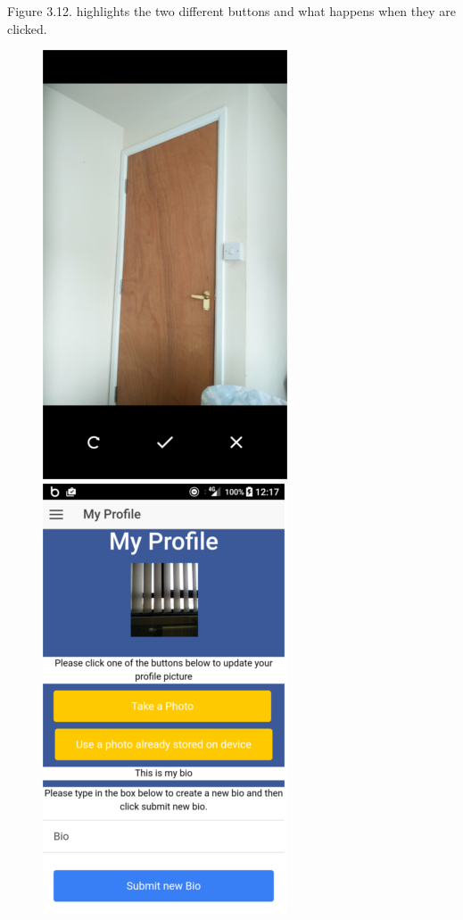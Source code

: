 Figure 3.12. highlights the two different buttons and what happens when they are clicked.
\begin{center}
\begin{figure}[H]
\includegraphics[scale=0.5]{images/cs}
\includegraphics[scale=0.5]{images/sc7}

\end{figure}
\end{center}
